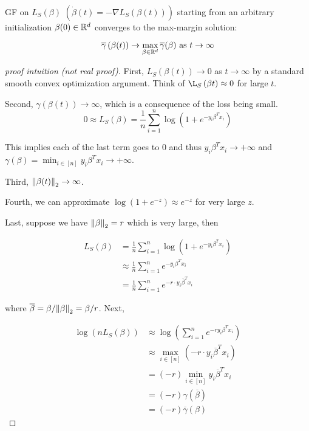 \begin{theorem} \ \\ 
    GF on \(L_S (\beta)\)   \(\left( \dot{\beta}(t) = - \nabla L_S \left( \beta(t)\right) \right)\) starting 
    from an arbitrary initialization \(\beta(0) \in \mathbb{R}^d\) converges to the max-margin solution: 

    \[
        \overline{\gamma} \left( \beta(t) \right) \to \max_{\beta \in \mathbb{R}^d} \overline{\gamma} (\beta) 
        \text{   as } t \to \infty 
    \] 
\end{theorem}

\begin{proof}[proof intuition (not real proof)]
    First, \(L_S \left( \beta (t)\right) \to 0\) as \(t \to \infty\) by a standard smooth convex 
    optimization argument. Think of \(\L_S \left( \beta{t} \right) \approx 0\) for large \(t\).  

    Second, \(\gamma \left( \beta(t) \right) \to \infty\), which is a consequence of the loss being small. 
    \[
        0 \approx L_S (\beta) = \frac{1}{n} \sum_{i=1}^n \log \left(  1 + e^{-y_i \beta^T x_i} \right)  
    \]

    This implies each of the last term goes to 0 and thus \(y_i \beta^T x_i \to + \infty\) and 
    \(\gamma (\beta) = \min_{i \in [n]} y_i \beta^T x_i \to + \infty\). 

    Third, \(\norm{\beta (t)}_2 \to \infty\). 

    Fourth, we can approximate \(\log (1 + e^{-z}) \approx e^{-z}\) for very large \(z\). 

    Last, suppose we have \(\norm{\beta}_2 = r\) which is very large, then  

    \begin{align*}
        L_S(\beta) &=   \frac{1}{n} \sum_{i=1}^n \log \left(  1 + e^{-y_i \beta^T x_i} \right) \\ 
        &\approx \frac{1}{n} \sum_{i=1}^n e^{-y_i \beta^T x_i} \\ 
        &= \frac{1}{n} \sum_{i=1}^n e^{- r \cdot y_i \overline{\beta}^T x_i}  
    \end{align*}

    where \(\overline{\beta} = \beta / \norm{\beta}_2 = \beta / r\). Next,  

    \begin{align*}
        \log \left( n L_S (\beta)  \right) &\approx \log \left(  \sum_{i=1}^n e^{-r y_i \beta^T x_i} \right) \\
        & \approx \max_{i \in [n]} \left( - r \cdot y_i \overline{\beta}^T x_i  \right) \\ 
        &= (-r) \min_{i \in [n]} y_i \overline{\beta}^T x_i \\ 
        &= (-r) \gamma(\overline{\beta}) \\ 
        &= (-r) \overline{\gamma} (\beta)
    \end{align*}


\end{proof}
